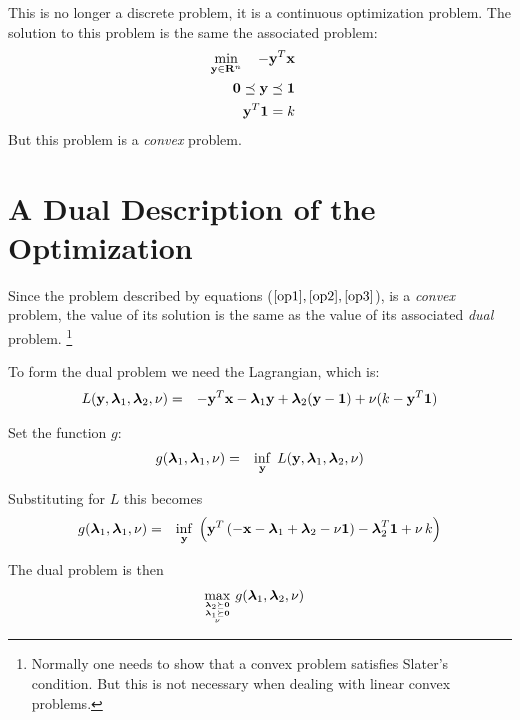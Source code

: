 \documentclass[12pt]{article}
\begin{document}
This is no longer a discrete problem, it is a continuous optimization problem.
The solution to this problem is the same the associated problem:
\begin{eqnarray}
	\mathop{\rm min}_{{\bf y} \in {\bf R}^n}\limits \quad -{\bf y}^T {\bf x} && \label{op1} \\ 
	{\bf 0} \preceq {\bf y} \preceq {\bf 1} &&  \label{op2}\\
	{\bf y}^T {\bf 1} =  k \label{op3} &&
\end{eqnarray}
But this problem is a {\it convex\/} problem.

\section{A Dual Description of the Optimization}
Since the problem described by equations ($\ref{op1}, \ref{op2}, \ref{op3}$), is
a {\it convex\/} problem, the value of its solution is the same as the value of 
its associated {\it dual\/} problem.%
\footnote{Normally one needs to show that a convex problem satisfies Slater's condition.
But this is not necessary when dealing with linear convex problems.}

To form the dual problem we need the Lagrangian, which is:
\begin{eqnarray}
	L({\bf y}, {\boldsymbol \lambda}_1, {\boldsymbol \lambda}_2, \nu) &=& -{\bf y}^T {\bf x} - {\boldsymbol \lambda}_1 {\bf y} + {\boldsymbol \lambda}_2 ({\bf y} - {\bf 1}) + \nu (k - {\bf y}^T {\bf 1}) 
\end{eqnarray}

Set the function $g$:
\begin{eqnarray}
	g({\boldsymbol \lambda}_1, {\boldsymbol \lambda}_1, \nu) &=& \mathop{\rm inf}_{\bf y} \; L({\bf y}, {\boldsymbol \lambda}_1, {\boldsymbol \lambda}_2, \nu) 
\end{eqnarray}

Substituting for $L$ this becomes
\begin{eqnarray}
	g({\boldsymbol \lambda}_1, {\boldsymbol \lambda}_1, \nu) &=& \mathop{\rm inf}_{\bf y} \; \left({\bf y}^T \left( -{\bf x} - {\boldsymbol \lambda}_1 + {\boldsymbol \lambda}_2 - \nu {\bf 1} \right) - {\boldsymbol \lambda}_2^T {\bf 1} + \nu \, k  \right)
\end{eqnarray}

The dual problem is then
\begin{eqnarray}
	\mathop{\rm max}_{{{\boldsymbol \lambda}_2 \succeq {\bf 0}} \atop {{{\boldsymbol \lambda}_1 \succeq {\bf 0}} \atop \nu}} g({\boldsymbol \lambda}_1, {\boldsymbol \lambda}_2, \nu) & & 
\end{eqnarray}
\end{document}
